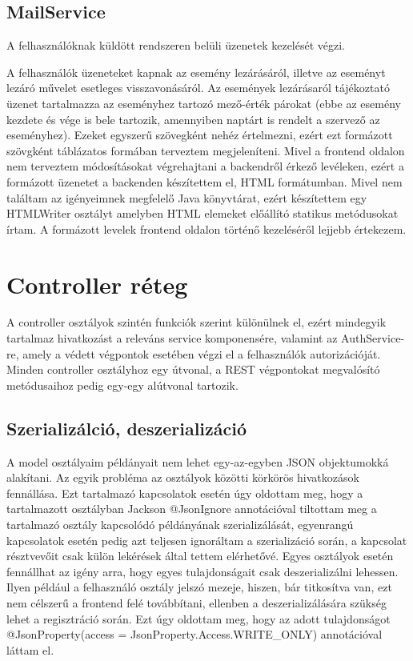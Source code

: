 \documentclass[a4paper,12pt]{report}
\theoremstyle{definition}
\theoremstyle{remark}
\begin{document}
\subsection{MailService}

A felhasználóknak küldött rendszeren belüli üzenetek kezelését végzi.

A felhasználók üzeneteket kapnak az esemény lezárásáról, illetve az eseményt lezáró művelet esetleges visszavonásáról. Az események lezárásaról tájékoztató üzenet tartalmazza az eseményhez tartozó mező-érték párokat (ebbe az esemény kezdete és vége is bele tartozik, amennyiben naptárt is rendelt a szervező az eseményhez). Ezeket egyszerű szövegként nehéz értelmezni, ezért ezt formázott szövgként táblázatos formában terveztem megjeleníteni. Mivel a frontend oldalon nem terveztem módosításokat végrehajtani a backendről érkező levéleken, ezért a formázott üzenetet a backenden készítettem el, HTML formátumban. Mivel nem találtam az igényeimnek megfelelő Java könyvtárat, ezért készítettem egy HTMLWriter osztályt amelyben HTML elemeket előállító statikus metódusokat írtam. A formázott levelek frontend oldalon történő kezeléséről lejjebb értekezem.

\section{Controller réteg}

A controller osztályok szintén funkciók szerint különülnek el, ezért mindegyik tartalmaz hivatkozást a releváns service komponensére, valamint az AuthService-re, amely a védett végpontok esetében végzi el a felhasználók autorizációját. Minden controller osztályhoz egy útvonal, a REST végpontokat megvalósító metódusaihoz pedig egy-egy alútvonal tartozik.

\subsection{Szerializálció, deszerializáció}

A model osztályaim példányait nem lehet egy-az-egyben JSON objektumokká alakítani. Az egyik probléma az osztályok közötti körkörös hivatkozások fennállása. Ezt tartalmazó kapcsolatok esetén úgy oldottam meg, hogy a tartalmazott osztályban Jackson @JsonIgnore annotációval tiltottam meg a tartalmazó osztály kapcsolódó példányának szerializálását, egyenrangú kapcsolatok esetén pedig azt teljesen ignoráltam a szerializáció során, a kapcsolat résztvevőit csak külön lekérések által tettem elérhetővé. Egyes osztályok esetén fennállhat az igény arra, hogy egyes tulajdonságait csak deszerializálni lehessen. Ilyen például a felhasználó osztály jelszó mezeje, hiszen, bár titkosítva van, ezt nem célszerű a frontend felé továbbítani, ellenben a deszerializálására szükség lehet a regisztráció során. Ezt úgy oldottam meg, hogy az adott tulajdonságot @JsonProperty(access = JsonProperty.Access.WRITE\_ONLY) annotációval láttam el.
\end{document}
